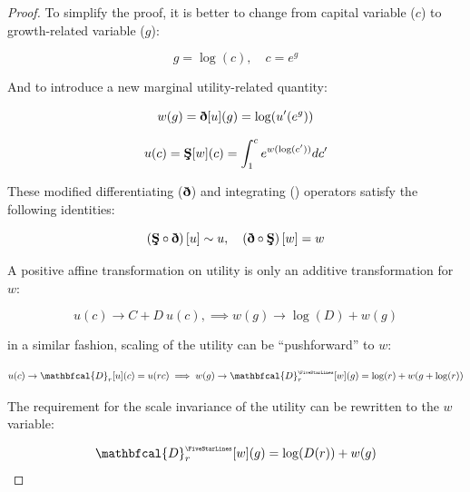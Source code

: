 \documentclass{article}
\theoremstyle{definition}
\begin{document}
\begin{proof}
    To simplify the proof, it is better to change from capital variable ($c$) to growth-related variable ($g$):
    
    \begin{equation}
        g = \log(c), \quad c = e^g
    \end{equation}

    And to introduce a new marginal utility-related quantity:
    
    \begin{equation}
    \label{eq:w(g)}
        w(g) = \text{\bf \dh}[u](g)  =  \log(u'(e^g))
    \end{equation}

    \begin{equation}
        u(c) = \text{\bf \c{S}}[w](c) =  \int_{1}^{c} e^{w(\log(c'))} d c'
    \end{equation}

    These modified differentiating ($\text{\bf \dh}$) and integrating () operators satisfy the following identities:

    \begin{equation}
        \left ( \text{\bf \c{S}} \circ \text{\bf \dh} \right ) [u] \sim u, \quad \left ( \text{\bf \dh} \circ \text{\bf \c{S}}  \right ) [w] = w
    \end{equation}

    A positive affine transformation on utility is only an additive transformation for $w$:

    \begin{equation}
        u(c) \to C + D \ u(c), \implies w(g) \to \log(D) + w(g)
    \end{equation}

    in a similar fashion, scaling of the utility can be ``pushforward'' \cite{book:SmoothManifolds} to $w$:

    \begin{equation}
        u(c) \to \mathbfcal{D}_r[u](c) = u(r c) \implies w(g) \to \mathbfcal{D}^{\text{\tiny \FiveStarLines}}_r[w](g) = \log(r) + w(g + \log(r))
    \end{equation}

    The requirement for the scale invariance of the utility can be rewritten to the $w$ variable:

    \begin{equation}
        \mathbfcal{D}^{\text{\tiny \FiveStarLines}}_r[w](g) = \log(D(r)) + w(g)
    \end{equation}


\end{proof}
\end{document}
